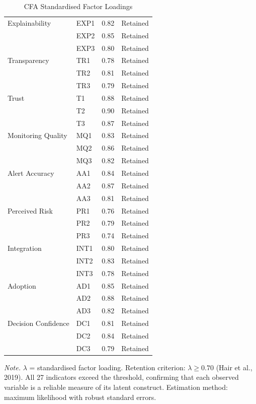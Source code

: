 \begin{table}[p]
\tablestripes
\caption{CFA Standardised Factor Loadings}
\tablefontsize
\begin{tabularx}{\textwidth}{@{} >{\raggedright\arraybackslash}p{3.5cm} L C >{\raggedright\arraybackslash}p{2cm} @{}}
\toprule
{} &  &  &  \\
\midrule
Explainability & EXP1 & 0.82 & Retained \\
 & EXP2 & 0.85 & Retained \\
 & EXP3 & 0.80 & Retained \\
\addlinespace
Transparency & TR1 & 0.78 & Retained \\
 & TR2 & 0.81 & Retained \\
 & TR3 & 0.79 & Retained \\
\addlinespace
Trust & T1 & 0.88 & Retained \\
 & T2 & 0.90 & Retained \\
 & T3 & 0.87 & Retained \\
\addlinespace
Monitoring Quality & MQ1 & 0.83 & Retained \\
 & MQ2 & 0.86 & Retained \\
 & MQ3 & 0.82 & Retained \\
\addlinespace
Alert Accuracy & AA1 & 0.84 & Retained \\
 & AA2 & 0.87 & Retained \\
 & AA3 & 0.81 & Retained \\
\addlinespace
Perceived Risk & PR1 & 0.76 & Retained \\
 & PR2 & 0.79 & Retained \\
 & PR3 & 0.74 & Retained \\
\addlinespace
Integration & INT1 & 0.80 & Retained \\
 & INT2 & 0.83 & Retained \\
 & INT3 & 0.78 & Retained \\
\addlinespace
Adoption & AD1 & 0.85 & Retained \\
 & AD2 & 0.88 & Retained \\
 & AD3 & 0.82 & Retained \\
\addlinespace
Decision Confidence & DC1 & 0.81 & Retained \\
 & DC2 & 0.84 & Retained \\
 & DC3 & 0.79 & Retained \\
\bottomrule
\end{tabularx}
\vspace{0.5em}\noindent\textit{Note.} $\lambda$ = standardised factor loading. Retention criterion: $\lambda \geq 0.70$ (Hair et al., 2019). All 27 indicators exceed the threshold, confirming that each observed variable is a reliable measure of its latent construct. Estimation method: maximum likelihood with robust standard errors.
\end{table}

